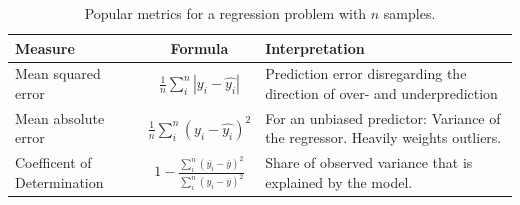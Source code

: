 






\begin{table}
  \caption{Popular metrics for a regression problem with $n$ samples.}
  \begin{center}
    \begin{tabularx}{\textwidth}{l c X}
      Measure & Formula & Interpretation \\
      \hline
      Mean squared error & $\frac{1}{n}\sum_i^n |y_i-\hat{y_i}|$ & Prediction error disregarding the direction of over- and underprediction \\
      Mean absolute error & $\frac{1}{n}\sum_i^n (y_i-\hat{y_i})^2$ & For an unbiased predictor: Variance of the regressor. Heavily weights outliers. \\
      Coefficent of Determination & $1 - \frac{\sum_i^n (\bar{y_i}-\bar{y})^2}{\sum_i^n (y_i-\bar{y})^2}$ & Share of observed variance that is explained by the model.\\
    \end{tabularx}
  \end{center}
  \label{tab:regr_metrics}
\end{table}

